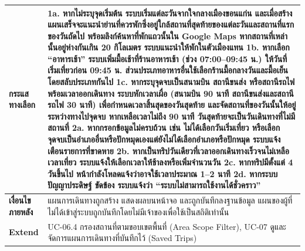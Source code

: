 \begin{longtable}{|p{3.2cm}|p{10cm}|}
\textbf{กระแสทางเลือก} & 1a. หากไม่ระบุจุดเริ่มต้น ระบบเริ่มแต่ละวันจากใจกลางเมืองขอนแก่น และเมื่อสร้างแผนเสร็จจะแนะนำย่านที่ควรพักซึ่งอยู่ใกล้สถานที่สุดท้ายของแต่ละวันและสถานที่แรกของวันถัดไป พร้อมลิงก์ค้นหาที่พักแถวนั้นใน Google Maps หากสถานที่เหล่านั้นอยู่ห่างกันเกิน 20 กิโลเมตร ระบบแนะนำให้พักในตัวเมืองแทน \newline 1b. หากเลือก ``อาหารเช้า'' ระบบเพิ่มมื้อเช้าที่ร้านอาหารเช้า (ช่วง 07:00--09:45 น.) ให้วันที่เริ่มเที่ยวก่อน 09:45 น. ส่วนประเภทอาหารอื่นใช้เลือกร้านมื้อกลางวันและมื้อเย็นโดยสลับประเภทกันไป \newline 1c. หากระบุจุดจบเป็นสนามบิน สถานีขนส่ง หรือสถานีรถไฟพร้อมเวลาออกเดินทาง ระบบหักเวลาเผื่อ (สนามบิน 90 นาที สถานีขนส่งและสถานีรถไฟ 30 นาที) เพื่อกำหนดเวลาสิ้นสุดของวันสุดท้าย และจัดสถานที่ของวันนั้นให้อยู่ระหว่างทางไปจุดจบ หากเหลือเวลาไม่ถึง 90 นาที วันสุดท้ายจะเป็นวันเดินทางที่ไม่มีสถานที่ \newline 2a. หากกรอกข้อมูลไม่ครบถ้วน เช่น ไม่ได้เลือกวันเริ่มเที่ยว หรือเลือกจุดจบเป็นอำเภออื่นหรือปักหมุดเองแต่ยังไม่ได้เลือกอำเภอหรือปักหมุด ระบบแจ้งเตือนรายการที่ขาดหาย \newline 2b. หากเป็นทริปวันเดียวที่เวลาออกเดินทางเร็วจนไม่เหลือเวลาเที่ยว ระบบแจ้งให้เลือกเวลาให้ช้าลงหรือเพิ่มจำนวนวัน \newline 2c. หากทริปมีตั้งแต่ 4 วันขึ้นไป หน้ากำลังโหลดแจ้งว่าอาจใช้เวลาประมาณ 1--2 นาที \newline 2d. หากระบบปัญญาประดิษฐ์ ขัดข้อง ระบบแจ้งว่า ``ระบบไม่สามารถใช้งานได้ชั่วคราว'' \\ \hline
\textbf{เงื่อนไขภายหลัง} & แผนการเดินทางถูกสร้าง แสดงผลบนหน้าจอ และถูกบันทึกลงฐานข้อมูล แผนของผู้ที่ไม่ได้เข้าสู่ระบบถูกบันทึกโดยไม่มีเจ้าของเพื่อใช้เป็นสถิติเท่านั้น \\ \hline
\textbf{Extend} & UC-06.4 กรองสถานที่ตามขอบเขตพื้นที่ (Area Scope Filter), UC-07 ดูและจัดการแผนการเดินทางที่บันทึกไว้ (Saved Trips) \\
\hline
\end{longtable}

